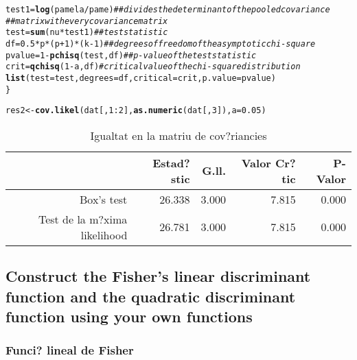 \documentclass[a4paper,titlepage,12pt]{article}\usepackage[]{graphicx}\usepackage[]{color}
\makeatletter
\newcommand{\hlnum}[1]{\textcolor[rgb]{0.686,0.059,0.569}{#1}}%
\newcommand{\hlcom}[1]{\textcolor[rgb]{0.678,0.584,0.686}{\textit{#1}}}%
\newcommand{\hlopt}[1]{\textcolor[rgb]{0,0,0}{#1}}%
\newcommand{\hlstd}[1]{\textcolor[rgb]{0.345,0.345,0.345}{#1}}%
\newcommand{\hlkwb}[1]{\textcolor[rgb]{0.69,0.353,0.396}{#1}}%
\newcommand{\hlkwc}[1]{\textcolor[rgb]{0.333,0.667,0.333}{#1}}%
\newcommand{\hlkwd}[1]{\textcolor[rgb]{0.737,0.353,0.396}{\textbf{#1}}}%
\newenvironment{kframe}{%
 \def\at@end@of@kframe{}%
 \ifinner\ifhmode%
  \def\at@end@of@kframe{\end{minipage}}%
  \begin{minipage}{\columnwidth}%
 \fi\fi%
 \def\FrameCommand##1{\hskip\@totalleftmargin \hskip-\fboxsep
 \colorbox{shadecolor}{##1}\hskip-\fboxsep
     \hskip-\linewidth \hskip-\@totalleftmargin \hskip\columnwidth}%
 \MakeFramed {\advance\hsize-\width
   \@totalleftmargin\z@ \linewidth\hsize
   \@setminipage}}%
 {\par\unskip\endMakeFramed%
 \at@end@of@kframe}
\newenvironment{knitrout}{}{} %
\makeatother
\begin{document}
\begin{knitrout}
\begin{kframe}
\begin{alltt}
    \hlstd{test1} \hlkwb{=} \hlkwd{log}\hlstd{(pamela}\hlopt{/}\hlstd{pame)}  \hlcom{## divides the determinant of the pooled covariance}
    \hlcom{## matrix with every covariance matrix}
    \hlstd{test} \hlkwb{=} \hlkwd{sum}\hlstd{(nu} \hlopt{*} \hlstd{test1)}  \hlcom{## test statistic}
    \hlstd{df} \hlkwb{=} \hlnum{0.5} \hlopt{*} \hlstd{p} \hlopt{*} \hlstd{(p} \hlopt{+} \hlnum{1}\hlstd{)} \hlopt{*} \hlstd{(k} \hlopt{-} \hlnum{1}\hlstd{)}  \hlcom{## degrees of freedom of the asymptotic chi-square}
    \hlstd{pvalue} \hlkwb{=} \hlnum{1} \hlopt{-} \hlkwd{pchisq}\hlstd{(test, df)}  \hlcom{## p-value of the test statistic}
    \hlstd{crit} \hlkwb{=} \hlkwd{qchisq}\hlstd{(}\hlnum{1} \hlopt{-} \hlstd{a, df)}  \hlcom{#critical value of the chi-square distribution}
    \hlkwd{list}\hlstd{(}\hlkwc{test} \hlstd{= test,} \hlkwc{degrees} \hlstd{= df,} \hlkwc{critical} \hlstd{= crit,} \hlkwc{p.value} \hlstd{= pvalue)}
\hlstd{\}}


\hlstd{res2} \hlkwb{<-} \hlkwd{cov.likel}\hlstd{(dat[,} \hlnum{1}\hlopt{:}\hlnum{2}\hlstd{],} \hlkwd{as.numeric}\hlstd{(dat[,} \hlnum{3}\hlstd{]),} \hlkwc{a} \hlstd{=} \hlnum{0.05}\hlstd{)}
\end{alltt}
\end{kframe}
\end{knitrout}


\begin{table}[ht]
\centering
\caption{Igualtat en la matriu de cov?riancies} 
\begin{tabular}{rrrrr}
  \hline
 & Estad?stic & G.ll. & Valor Cr?tic & P-Valor \\ 
  \hline
Box's test & 26.338 & 3.000 & 7.815 & 0.000 \\ 
  Test de la m?xima likelihood & 26.781 & 3.000 & 7.815 & 0.000 \\ 
   \hline
\end{tabular}
\end{table}




\subsection{Construct the Fisher's linear discriminant function and the quadratic discriminant function using your own functions}
\subsubsection{Funci? lineal de Fisher}
\end{document}
